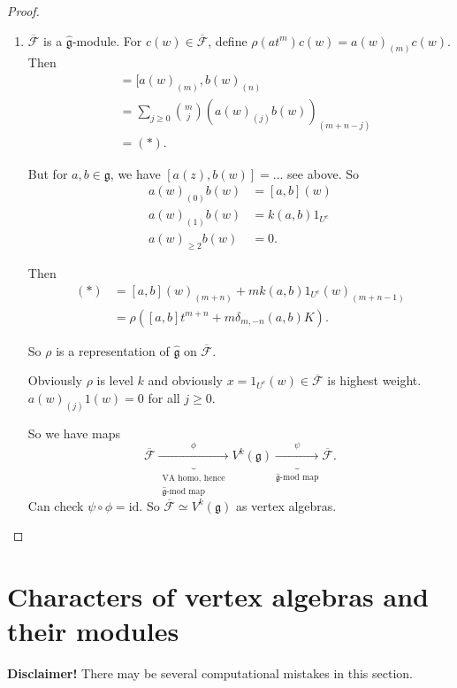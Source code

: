 \begin{proof}
\begin{enumerate}
\item $\overline{\mathcal{F}}$ is a $\hat{\mathfrak{g}}$-module.
For $c(w) \in \overline{\mathcal{F}}$,
define $\rho(at^m)c(w)=a(w)_{(m)}c(w)$.
Then
\begin{align*}
[\rho(at^m),\rho(bt^n)]&=[a(w)_{(m)},b(w)_{(n)}\\
&=\sum_{j \geq 0}\binom{m}{j}(a(w)_{(j)}b(w))_{(m+n-j)}\\
&=(*).
\end{align*}

\noindent
But for $a,b \in \mathfrak{g}$, we have
$[a(z),b(w)]=\ldots$ see above.
So
\begin{align*}
a(w)_{(0)}b(w)&=[a,b](w)\\
a(w)_{(1)}b(w)&=k(a,b)1_{U^c}\\
a(w)_{\geq 2}b(w)&=0.
\end{align*}

\noindent
Then
\begin{align*}
(*)&=[a,b](w)_{(m+n)}+mk(a,b)1_{U^c}(w)_{(m+n-1)}\\
&=\rho([a,b]t^{m+n}+m\delta_{m,-n}(a,b)K).
\end{align*}

\noindent
So $\rho$ is a representation of
$\hat{\mathfrak{g}}$ on $\overline{\mathcal{F}}$.

Obviously $\rho$ is level $k$
and obviously $x=1_{U^c}(w) \in \overline{\mathcal{F}}$
is highest weight.
$a(w)_{(j)}1(w)=0$ for all $j\geq 0$.

So we have maps
$$
\overline{\mathcal{F}}\underbrace{\xrightarrow{\phi}}
_{\substack{\text{VA homo, hence} \\ \hat{\mathfrak{g}}\text{-mod map}}}
V^k(\mathfrak{g})\underbrace{\xrightarrow{\psi}}_{
\hat{\mathfrak{g}}\text{-mod map}}
\overline{\mathcal{F}}.
$$
Can check $\psi \circ \phi=\text{id}$.
So $\overline{\mathcal{F}}\simeq V^k(\mathfrak{g})$
as vertex algebras.
\end{enumerate}
\end{proof}


\section{Characters of vertex algebras and their modules}
\label{section-characters-of-vertex-algebras}

\noindent
{\bf Disclaimer!} There may be several computational mistakes in this section.

